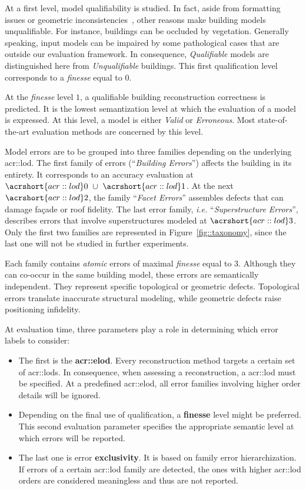 \documentclass[runningheads]{llncs}
\begin{document}
At a first level, model qualifiability is studied. In fact, aside from formatting issues or geometric inconsistencies~\cite{ledoux2018val3dity}, other reasons make building models unqualifiable. For instance, buildings can be occluded by vegetation. Generally speaking, input models can be impaired by some pathological cases that are outside our evaluation framework. In consequence, \textit{Qualifiable} models are distinguished here from \textit{Unqualifiable} buildings. This first qualification level corresponds to a \textit{finesse} equal to $0$.

At the \textit{finesse} level $1$, a qualifiable building reconstruction correctness is predicted. It is the lowest semantization level at which the evaluation of a model is expressed. At this level, a model is either \textit{Valid} or \textit{Erroneous}. Most state-of-the-art evaluation methods are concerned by this level.

Model errors are to be grouped into three families depending on the underlying \acrshort{acr::lod}. The first family of errors (``\textit{Building Errors}'') affects the building in its entirety. It corresponds to an accuracy evaluation at $\acrshort{acr::lod}0\text{ } \cup \text{ }\acrshort{acr::lod}1$. At the next $\acrshort{acr::lod}2$, the family ``\textit{Facet Errors}'' assembles defects that can damage fa\c{c}ade or roof fidelity. The last error family, \textit{i.e.} ``\textit{Superstructure Errors}'', describes errors that involve superstructures modeled at $\acrshort{acr::lod}3$. Only the first two families are represented in Figure~\ref{fig::taxonomy}, since the last one will not be studied in further experiments.

Each family contains \textit{atomic} errors of maximal \textit{finesse} equal to $3$. Although they can co-occur in the same building model, these errors are semantically independent. They represent specific topological or geometric defects. Topological errors translate inaccurate structural modeling, while geometric defects raise positioning infidelity.

At evaluation time, three parameters play a role in determining which error labels to consider:
\begin{itemize}
    \item The first is the \textbf{\acrfull{acr::elod}}. Every reconstruction method targets a certain set of \glspl{acr::lod}. In consequence, when assessing a reconstruction, a \acrshort{acr::lod} must be specified. At a predefined \acrshort{acr::elod}, all error families involving higher order details will be ignored.
    \item Depending on the final use of qualification, a \textbf{finesse} level might be preferred. This second evaluation parameter specifies the appropriate semantic level at which errors will be reported.
    \item The last one is error \textbf{exclusivity}. It is based on family error hierarchization. If errors of a certain \acrshort{acr::lod} family are detected, the ones with higher \acrshort{acr::lod} orders are considered meaningless and thus are not reported.
\end{itemize}
\end{document}
